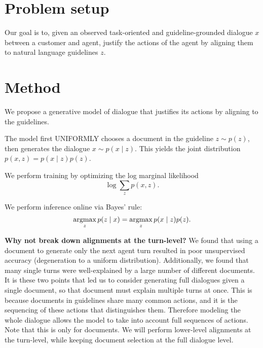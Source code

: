 \documentclass[11pt]{article}
\begin{document}
\section{Problem setup}
Our goal is to, given an observed task-oriented and guideline-grounded dialogue $x$
between a customer and agent,
justify the actions of the agent by aligning them to natural language guidelines $z$.

\section{Method}
We propose a generative model of dialogue that justifies its actions by
aligning to the guidelines.

The model first UNIFORMLY chooses a document in the guideline $z \sim p(z)$,
then generates the dialogue $x \sim p(x \mid z)$.
This yields the joint distribution $p(x,z) = p(x\mid z)p(z)$.

We perform training by optimizing the log marginal likelihood
\begin{equation}
\log\sum_z p(x,z).
\end{equation}

We perform inference online via Bayes' rule:
\begin{equation}
\operatorname*{argmax}_z p(z\mid x) = \operatorname*{argmax}_zp(x\mid z)p(z).
\end{equation}

\textbf{Why not break down alignments at the turn-level?}
We found that using a document to generate only the next agent turn resulted in poor
unsupervised accuracy (degeneration to a uniform distribution).
Additionally, we found that many single turns were well-explained by a large number of different
documents.
It is these two points that led us to consider generating full dialogues given a single document,
so that document must explain multiple turns at once.
This is because documents in guidelines share many common actions,
and it is the sequencing of these actions that distinguishes them.
Therefore modeling the whole dialogue allows the model to take into account full
sequences of actions.
Note that this is only for documents. We will perform lower-level alignments at
the turn-level, while keeping document selection at the full dialogue level.
\end{document}
